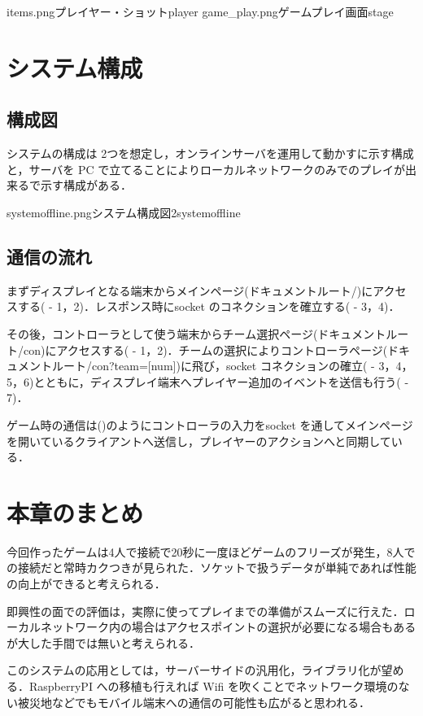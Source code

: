 \myfigtwo
{items.png}{プレイヤー・ショット}{player}
{game_play.png}{ゲームプレイ画面}{stage}


\newpage
\section{システム構成}
\subsection{構成図}
システムの構成は 2つを想定し，オンラインサーバを運用して動かすに示す構成と，サーバを PC で立てることによりローカルネットワークのみでのプレイが出来るで示す構成がある．

{systemoffline.png}{システム構成図2}{systemoffline}

\subsection{通信の流れ}
まずディスプレイとなる端末からメインページ(ドキュメントルート/)にアクセスする( - 1，2)．レスポンス時にsocket のコネクションを確立する( - 3，4)．

その後，コントローラとして使う端末からチーム選択ページ(ドキュメントルート/con)にアクセスする( - 1，2)．チームの選択によりコントローラページ(ドキュメントルート/con?team=[num])に飛び，socket コネクションの確立( - 3，4，5，6)とともに，ディスプレイ端末へプレイヤー追加のイベントを送信も行う( - 7)．

ゲーム時の通信は()のようにコントローラの入力をsocket を通してメインページを開いているクライアントへ送信し，プレイヤーのアクションへと同期している．



\newpage

\section{本章のまとめ}
今回作ったゲームは4人で接続で20秒に一度ほどゲームのフリーズが発生，8人での接続だと常時カクつきが見られた．ソケットで扱うデータが単純であれば性能の向上ができると考えられる．

即興性の面での評価は，実際に使ってプレイまでの準備がスムーズに行えた．ローカルネットワーク内の場合はアクセスポイントの選択が必要になる場合もあるが大した手間では無いと考えられる．


このシステムの応用としては，サーバーサイドの汎用化，ライブラリ化が望める．RaspberryPI への移植も行えれば Wifi を吹くことでネットワーク環境のない被災地などでもモバイル端末への通信の可能性も広がると思われる．

\newpage
